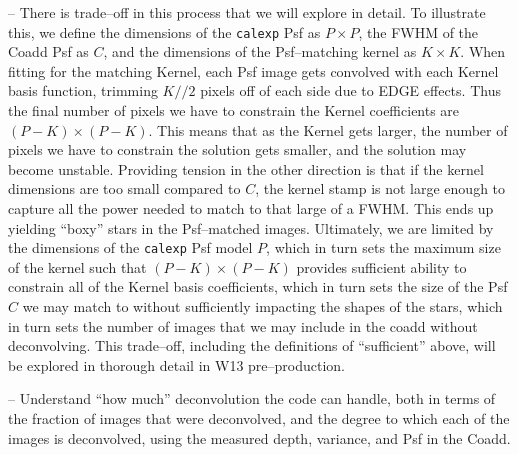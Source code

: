 \documentclass[12pt]{article}
\begin{document}
-- There is trade--off in this process that we will explore in detail.  
To illustrate this, we define the dimensions of
the {\tt calexp} Psf as $P \times P$, the FWHM of the Coadd Psf as
$C$, and the dimensions of the Psf--matching kernel as $K \times K$.
When fitting for the matching Kernel, each Psf image gets convolved
with each Kernel basis function, trimming $K//2$ pixels off of each
side due to EDGE effects.  Thus the final number of pixels we have to
constrain the Kernel coefficients are $(P-K) \times (P-K)$.  This
means that as the Kernel gets larger, the number of pixels we have to
constrain the solution gets smaller, and the solution may become
unstable.  Providing tension in the other direction is that if the
kernel dimensions are too small compared to $C$, the kernel stamp is
not large enough to capture all the power needed to match to that
large of a FWHM.  This ends up yielding ``boxy'' stars in the
Psf--matched images.  Ultimately, we are limited by the dimensions of
the {\tt calexp} Psf model $P$, which in turn sets the maximum size of
the kernel such that $(P-K) \times (P-K)$ provides sufficient ability
to constrain all of the Kernel basis coefficients, which in turn sets
the size of the Psf $C$ we may match to without sufficiently impacting
the shapes of the stars, which in turn sets the number of images that we 
may include in the coadd without deconvolving.  This trade--off, including the definitions
of ``sufficient'' above, will be explored in thorough detail in W13
pre--production.





-- Understand ``how much'' deconvolution the code can handle,
both in terms of the fraction of images that were deconvolved, and the
degree to which each of the images is deconvolved, using the measured 
depth, variance, and Psf in the Coadd.
\end{document}
